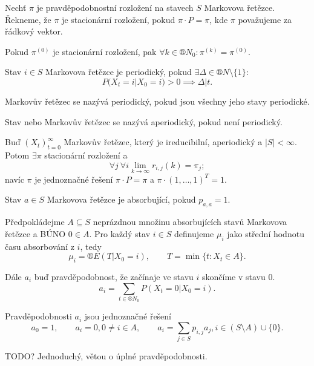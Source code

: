 \documentclass[12pt]{article}					%
\begin{document}
\begin{definice}
	Nechť $\pi$ je pravděpodobnostní rozložení na stavech $S$ Markovova řetězce. Řekneme, že $\pi$ je stacionární rozložení, pokud $\pi·P = \pi$, kde $\pi$ považujeme za řádkový vektor.
\end{definice}

\begin{dusledek}
	Pokud $\pi^{(0)}$ je stacionární rozložení, pak $\forall k \in ®N_0: \pi^{(k)} = \pi^{(0)}$.
\end{dusledek}

\begin{definice}
	Stav $i \in S$ Markovova řetězce je periodický, pokud $\exists \Delta \in ®N \setminus \{1\}$:
	$$ P(X_t = i | X_0 = i) > 0 \implies \Delta | t. $$

	Markovův řetězec se nazývá periodický, pokud jsou všechny jeho stavy periodické.

	Stav nebo Markovův řetězec se nazývá aperiodický, pokud není periodický.
\end{definice}

\begin{veta}
	Buď $(X_t)_{t=0}^∞$ Markovův řetězec, který je ireducibilní, aperiodický a $|S| < ∞$. Potom $\exists \pi$ stacionární rozložení a
	$$ \forall j\ \forall i \lim_{k \rightarrow ∞} r_{i, j}(k) = \pi_j; $$
	navíc $\pi$ je jednoznačné řešení $\pi·P = \pi$ a $\pi·(1, …, 1)^T = 1$.
\end{veta}

\begin{definice}
	Stav $a \in S$ Markovova řetězce je absorbující, pokud $p_{a, a} = 1$.
\end{definice}

\begin{definice}
	Předpokládejme $A \subseteq S$ neprázdnou množinu absorbujících stavů Markovova řetězce a BÚNO $0 \in A$. Pro každý stav $i \in S$ definujeme $\mu_i$ jako střední hodnotu času absorbování z $i$, tedy
	$$ \mu_i = ®E(T | X_0 = i), \qquad T = \min\{t: X_t \in A\}. $$

	Dále $a_i$ buď pravděpodobnost, že začínaje ve stavu $i$ skončíme v stavu $0$.
	$$ a_i = \sum_{t \in ®N_0} P(X_t = 0 | X_0 = i). $$
\end{definice}

\begin{veta}
	Pravděpodobnosti $a_i$ jsou jednoznačné řešení
	$$ a_0 = 1, \qquad a_i = 0, 0 ≠ i \in A, \qquad a_i = \sum_{j \in S} p_{i, j} a_j, i \in (S \setminus A) \cup \{0\}. $$

	\begin{dukazin}
		TODO? Jednoduchý, větou o úplné pravděpodobnosti. %
	\end{dukazin}
\end{veta}
\end{document}
